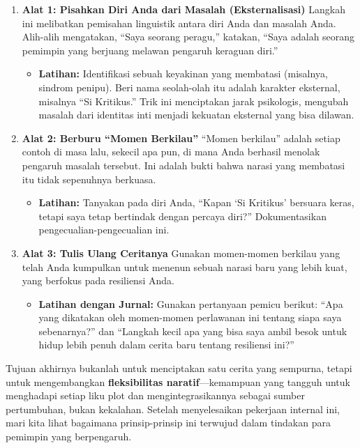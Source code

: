 \documentclass[
  letterpaper,
  DIV=11,
  numbers=noendperiod]{scrreprt}
\providecommand{\tightlist}{%
  \setlength{\itemsep}{0pt}\setlength{\parskip}{0pt}}
\begin{document}
\begin{enumerate}
\def\labelenumi{\arabic{enumi}.}
\item
  \textbf{Alat 1: Pisahkan Diri Anda dari Masalah (Eksternalisasi)}
  Langkah ini melibatkan pemisahan linguistik antara diri Anda dan
  masalah Anda. Alih-alih mengatakan, ``Saya seorang peragu,'' katakan,
  ``Saya adalah seorang pemimpin yang berjuang melawan pengaruh keraguan
  diri.''

  \begin{itemize}
  \tightlist
  \item
    \textbf{Latihan:} Identifikasi sebuah keyakinan yang membatasi
    (misalnya, sindrom penipu). Beri nama seolah-olah itu adalah
    karakter eksternal, misalnya ``Si Kritikus.'' Trik ini menciptakan
    jarak psikologis, mengubah masalah dari identitas inti menjadi
    kekuatan eksternal yang bisa dilawan.
  \end{itemize}
\item
  \textbf{Alat 2: Berburu ``Momen Berkilau''} ``Momen berkilau'' adalah
  setiap contoh di masa lalu, sekecil apa pun, di mana Anda berhasil
  menolak pengaruh masalah tersebut. Ini adalah bukti bahwa narasi yang
  membatasi itu tidak sepenuhnya berkuasa.

  \begin{itemize}
  \tightlist
  \item
    \textbf{Latihan:} Tanyakan pada diri Anda, ``Kapan `Si Kritikus'
    bersuara keras, tetapi saya tetap bertindak dengan percaya diri?''
    Dokumentasikan pengecualian-pengecualian ini.
  \end{itemize}
\item
  \textbf{Alat 3: Tulis Ulang Ceritanya} Gunakan momen-momen berkilau
  yang telah Anda kumpulkan untuk menenun sebuah narasi baru yang lebih
  kuat, yang berfokus pada resiliensi Anda.

  \begin{itemize}
  \tightlist
  \item
    \textbf{Latihan dengan Jurnal:} Gunakan pertanyaan pemicu berikut:
    ``Apa yang dikatakan oleh momen-momen perlawanan ini tentang siapa
    saya sebenarnya?'' dan ``Langkah kecil apa yang bisa saya ambil
    besok untuk hidup lebih penuh dalam cerita baru tentang resiliensi
    ini?''
  \end{itemize}
\end{enumerate}

Tujuan akhirnya bukanlah untuk menciptakan satu cerita yang sempurna,
tetapi untuk mengembangkan \textbf{fleksibilitas naratif}---kemampuan
yang tangguh untuk menghadapi setiap liku plot dan mengintegrasikannya
sebagai sumber pertumbuhan, bukan kekalahan. Setelah menyelesaikan
pekerjaan internal ini, mari kita lihat bagaimana prinsip-prinsip ini
terwujud dalam tindakan para pemimpin yang berpengaruh.
\end{document}
